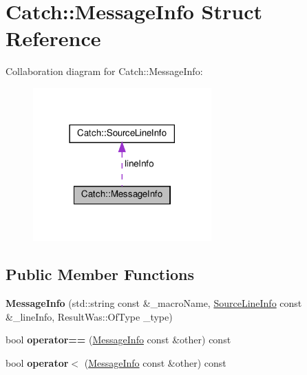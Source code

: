 \hypertarget{structCatch_1_1MessageInfo}{}\section{Catch\+:\+:Message\+Info Struct Reference}
\label{structCatch_1_1MessageInfo}


Collaboration diagram for Catch\+:\+:Message\+Info\+:
\nopagebreak
\begin{figure}[H]
\begin{center}
\leavevmode
\includegraphics[width=194pt]{structCatch_1_1MessageInfo__coll__graph}
\end{center}
\end{figure}
\subsection*{Public Member Functions}
\begin{DoxyCompactItemize}
\item 
\mbox{\label{structCatch_1_1MessageInfo_a2e336c33ebef7af3c1bbae6a56e14f8a}} 
{\bfseries Message\+Info} (std\+::string const \&\+\_\+macro\+Name, \hyperlink{structCatch_1_1SourceLineInfo}{Source\+Line\+Info} const \&\+\_\+line\+Info, Result\+Was\+::\+Of\+Type \+\_\+type)
\item 
\mbox{\label{structCatch_1_1MessageInfo_af4b37f2172ba55395813b4bb6bbbde1a}} 
bool {\bfseries operator==} (\hyperlink{structCatch_1_1MessageInfo}{Message\+Info} const \&other) const
\item 
\mbox{\label{structCatch_1_1MessageInfo_a8254cb8fca2da02a29a9843cdcb79df1}} 
bool {\bfseries operator$<$} (\hyperlink{structCatch_1_1MessageInfo}{Message\+Info} const \&other) const
\end{DoxyCompactItemize}
